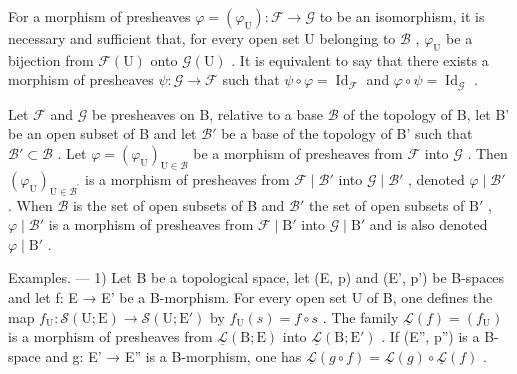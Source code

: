 For a morphism of presheaves \(\varphi = (\varphi_{\mathrm{U}})\colon \mathcal{F}\to \mathcal{G}\) to be an isomorphism, it is necessary and sufficient that, for every open set U belonging to \(\mathcal{B}\) , \(\varphi_{\mathrm{U}}\) be a bijection from \(\mathcal{F}(\mathrm{U})\) onto \(\mathcal{G}(\mathrm{U})\) . It is equivalent to say that there exists a morphism of presheaves \(\psi \colon \mathcal{G}\to \mathcal{F}\) such that \(\psi \circ \varphi = \operatorname{Id}_{\mathcal{F}}\) and \(\varphi \circ \psi = \operatorname{Id}_{\mathcal{G}}\) .

Let \(\mathcal{F}\) and \(\mathcal{G}\) be presheaves on B, relative to a base \(\mathcal{B}\) of the topology of B, let B' be an open subset of B and let \(\mathcal{B}'\) be a base of the topology of B' such that \(\mathcal{B}' \subset \mathcal{B}\) . Let \(\varphi = (\varphi_{\mathrm{U}})_{\mathrm{U} \in \mathcal{B}}\) be a morphism of presheaves from \(\mathcal{F}\) into \(\mathcal{G}\) . Then \((\varphi_{\mathrm{U}})_{\mathrm{U}\in \mathcal{B}^{\prime}}\) is a morphism of presheaves from \(\mathcal{F}\mid \mathcal{B}'\) into \(\mathcal{G}\mid \mathcal{B}'\) , denoted \(\varphi \mid \mathcal{B}'\) . When \(\mathcal{B}\) is the set of open subsets of B and \(\mathcal{B}'\) the set of open subsets of \(\mathrm{B}'\) , \(\varphi \mid \mathcal{B}'\) is a morphism of presheaves from \(\mathcal{F}\mid \mathrm{B}'\) into \(\mathcal{G}\mid \mathrm{B}'\) and is also denoted \(\varphi \mid \mathrm{B}'\) .

Examples. --- 1) Let B be a topological space, let (E, p) and (E', p') be B-spaces and let f: E → E' be a B-morphism. For every open set U of B, one defines the map \(f_{\mathrm{U}} \colon \mathcal{S}(\mathrm{U}; \mathrm{E}) \to \mathcal{S}(\mathrm{U}; \mathrm{E}')\) by \(f_{\mathrm{U}}(s) = f \circ s\) . The family \(\underline{\mathcal{L}}(f) = (f_{\mathrm{U}})\) is a morphism of presheaves from \(\underline{\mathcal{L}}(\mathrm{B}; \mathrm{E})\) into \(\underline{\mathcal{L}}(\mathrm{B}; \mathrm{E}')\) . If (E'', p'') is a B-space and g: E' → E'' is a B-morphism, one has \(\underline{\mathcal{L}}(g \circ f) = \underline{\mathcal{L}}(g) \circ \underline{\mathcal{L}}(f)\) .

